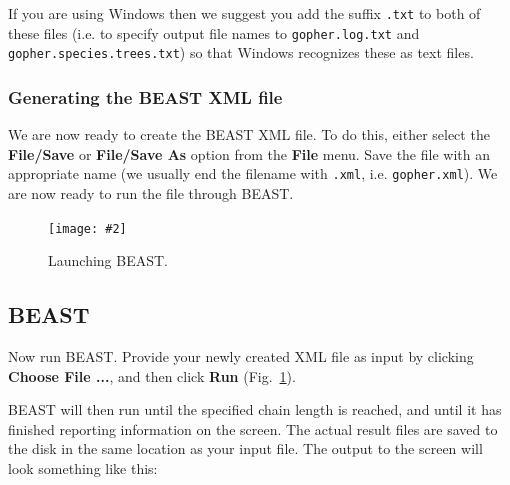 \documentclass{article}
\newcommand{\includeimage}[2][]{%
\texttt{[image: \#2]}
}
\begin{document}
If you are using Windows then we suggest you add the suffix \texttt{.txt} to both of these files (i.e. to specify output file names to \texttt{gopher.log.txt} and \texttt{gopher.species.trees.txt}) so that Windows recognizes
these as text files. 

\subsubsection{Generating the BEAST XML file }

We are now ready to create the BEAST XML file. To do this, either select the {\bf File/Save} or {\bf File/Save As} option from the \textbf{File} menu. Save the file with an appropriate name (we usually end the filename with \texttt{.xml}, i.e. \texttt{gopher.xml}). We are now ready to run the file through BEAST. 

\begin{figure}[h]
\centering
\includeimage[width=0.45\textwidth]{figures/BEAST2}
\caption{\label{fig.BEAST} Launching BEAST.}
\end{figure}

\clearpage

\subsection{BEAST}

Now run BEAST. Provide your newly created XML file as input by clicking \textbf{Choose File ...}, and then click \textbf{Run} (Fig.~\ref{fig.BEAST}).

BEAST will then run until the specified chain length is reached, and until it has finished
reporting information on the screen. The actual result files are
saved to the disk in the same location as your input file. The output to the screen will
look something like this: 
\end{document}
